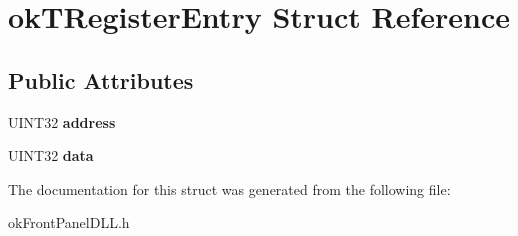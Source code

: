 \hypertarget{structokTRegisterEntry}{\section{ok\+T\+Register\+Entry Struct Reference}
\label{structokTRegisterEntry}
}
\subsection*{Public Attributes}
\begin{DoxyCompactItemize}
\item 
\hypertarget{structokTRegisterEntry_a3eaf9be8d61771d52ae8775c56e54991}{U\+I\+N\+T32 {\bfseries address}}\label{structokTRegisterEntry_a3eaf9be8d61771d52ae8775c56e54991}

\item 
\hypertarget{structokTRegisterEntry_ad6a3e039fa247cb38051b482c85e1ec0}{U\+I\+N\+T32 {\bfseries data}}\label{structokTRegisterEntry_ad6a3e039fa247cb38051b482c85e1ec0}

\end{DoxyCompactItemize}


The documentation for this struct was generated from the following file\+:\begin{DoxyCompactItemize}
\item 
ok\+Front\+Panel\+D\+L\+L.\+h\end{DoxyCompactItemize}

